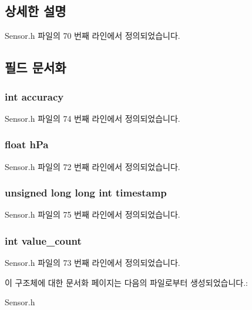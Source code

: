 \subsection{상세한 설명}


Sensor.\-h 파일의 70 번째 라인에서 정의되었습니다.



\subsection{필드 문서화}
\hypertarget{struct__Pressure__data_a5565cf9073275f9713f9016e7c10d25f}{
\subsubsection[{accuracy}]{\setlength{\rightskip}{0pt plus 5cm}int accuracy}}\label{struct__Pressure__data_a5565cf9073275f9713f9016e7c10d25f}


Sensor.\-h 파일의 74 번째 라인에서 정의되었습니다.

\hypertarget{struct__Pressure__data_af5bafbc5db27b95f2b41516f5f61336f}{
\subsubsection[{h\-Pa}]{\setlength{\rightskip}{0pt plus 5cm}float h\-Pa}}\label{struct__Pressure__data_af5bafbc5db27b95f2b41516f5f61336f}


Sensor.\-h 파일의 72 번째 라인에서 정의되었습니다.

\hypertarget{struct__Pressure__data_a8de02c4128636a7bf630ff5428f60c8d}{
\subsubsection[{timestamp}]{\setlength{\rightskip}{0pt plus 5cm}unsigned long long int timestamp}}\label{struct__Pressure__data_a8de02c4128636a7bf630ff5428f60c8d}


Sensor.\-h 파일의 75 번째 라인에서 정의되었습니다.

\hypertarget{struct__Pressure__data_a40a079bfc72408819dc78da308203a74}{
\subsubsection[{value\-\_\-count}]{\setlength{\rightskip}{0pt plus 5cm}int value\-\_\-count}}\label{struct__Pressure__data_a40a079bfc72408819dc78da308203a74}


Sensor.\-h 파일의 73 번째 라인에서 정의되었습니다.



이 구조체에 대한 문서화 페이지는 다음의 파일로부터 생성되었습니다.\-:\begin{DoxyCompactItemize}
\item 
Sensor.\-h\end{DoxyCompactItemize}
